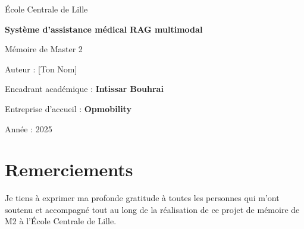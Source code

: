 \documentclass[12pt,a4paper]{report}
\begin{document}
\begin{titlepage}
  \centering
  {\LARGE École Centrale de Lille \par}
  \vspace{1.5cm}
  {\Huge \textbf{Système d'assistance médical RAG multimodal} \par}
  \vspace{1.0cm}
  {\Large Mémoire de Master 2 \par}
  \vspace{1.0cm}
  {\Large Auteur : [Ton Nom] \par}
  {\Large Encadrant académique : \textbf{Intissar Bouhrai} \par}
  {\Large Entreprise d'accueil : \textbf{Opmobility} \par}
  \vfill
  {\large Année : 2025 \par}
\end{titlepage}

\begin{abstract}
Ce travail présente la conception, l'implémentation et l'évaluation d'un système d'assistance médicale fondé sur Retrieval‑Augmented Generation (RAG) et capable de traiter des informations textuelles et visuelles. Le pipeline comprend : (1) la préparation et le découpage du corpus source en fragments (chunks), (2) la génération d'embeddings à l'aide de Sentence‑Transformers, (3) le stockage et la recherche vectorielle via Qdrant, (4) un reranker Cross‑Encoder pour améliorer la précision des extraits récupérés, et (5) un agent orchestré par LangGraph qui combine appels d'outils (vision multimodale, décomposition de requêtes, retriever et reranker) et génération par un LLM (ChatGroq / Llama3). Le système est conteneurisé avec Docker pour faciliter le déploiement et la reproductibilité. Nous présentons les choix techniques, le protocole d'évaluation basé sur des métriques de retrieval (recall@k, MRR) et une évaluation qualitative des réponses multimodales. Enfin, nous discutons des limites (hallucinations, contraintes éthiques liées à l'utilisation médicale) et proposons des pistes d'amélioration.
\end{abstract}

\chapter*{Remerciements}
Je tiens à exprimer ma profonde gratitude à toutes les personnes qui m'ont soutenu et accompagné tout au long de la réalisation de ce projet de mémoire de M2 à l'École Centrale de Lille.
\end{document}
